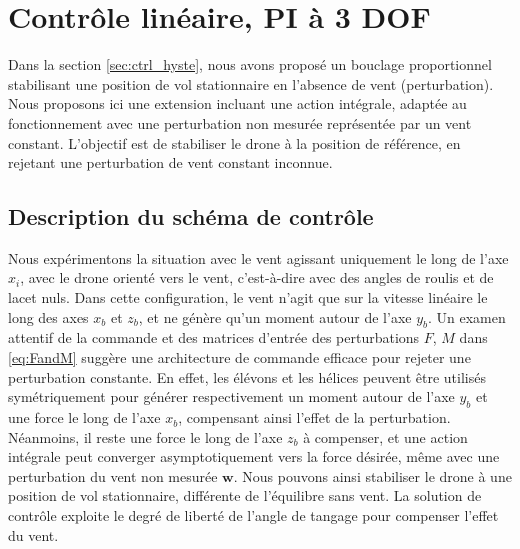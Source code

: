 \section{Contrôle linéaire, PI à 3 DOF}
\label{sec:3dofcmd}
Dans la section \ref{sec:ctrl_hyste}, nous avons proposé un bouclage proportionnel stabilisant une position de vol stationnaire en l'absence de vent (perturbation). Nous proposons ici une extension incluant une action intégrale, adaptée au fonctionnement avec une perturbation non mesurée représentée par un vent constant. L'objectif est de stabiliser le drone à la position de référence, en rejetant une perturbation de vent constant inconnue.

\subsection{Description du schéma de contrôle}
Nous expérimentons la situation avec le vent agissant uniquement le long de l'axe $x_{i}$, avec le drone orienté vers le vent, c'est-à-dire avec des angles de roulis et de lacet nuls. Dans cette configuration, le vent n'agit que sur la vitesse linéaire le long des axes $x_{b}$ et $z_{b}$, et ne génère qu'un moment autour de l'axe $y_{b}$. Un examen attentif de la commande et des matrices d'entrée des perturbations $F$, $M$ dans \eqref{eq:FandM} suggère une architecture de commande efficace pour rejeter une perturbation constante. En effet, les élévons et les hélices peuvent être utilisés symétriquement pour générer respectivement un moment autour de l'axe $y_{b}$ et une force le long de l'axe $x_{b}$, compensant ainsi l'effet de la perturbation. Néanmoins, il reste une force le long de l'axe $z_{b}$ à compenser, et une action intégrale peut converger asymptotiquement vers la force désirée, même avec une perturbation du vent non mesurée $\boldsymbol{w}$. Nous pouvons ainsi stabiliser le drone à une position de vol stationnaire, différente de l'équilibre sans vent. La solution de contrôle exploite le degré de liberté de l'angle de tangage pour compenser l'effet du vent.

